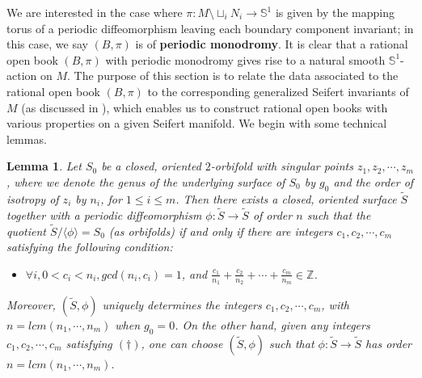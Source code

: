 \documentclass[11pt]{amsart}
\theoremstyle{plain}
\numberwithin{theorem}{section}
\newtheorem{lemma}[theorem]{Lemma}
\theoremstyle{definition}
\newcommand{\Z}{{\mathbb Z}}
\newcommand{\s}{{\mathbb S}}
\begin{document}
We are interested in the case where $\pi: M\setminus \sqcup_i N_i\rightarrow \s^1$ is given by the mapping torus of a periodic diffeomorphism leaving each boundary component invariant; in this case, we say $(B,\pi)$ is of {\bf periodic monodromy}. It is clear that a rational open book $(B,\pi)$ with periodic monodromy gives rise to a natural smooth $\s^1$-action on $M$. The purpose of this section is to relate the data associated to the rational open book $(B,\pi)$ to the corresponding generalized Seifert invariants of $M$ (as discussed in \cite{N}), which enables us to construct rational open books with various properties on a given Seifert manifold. We begin with some technical lemmas. 

\begin{lemma}
Let $S_0$ be a closed, oriented $2$-orbifold with singular points $z_1,z_2,\cdots,z_m$, where we denote the genus of the underlying surface of $S_0$ by $g_0$ and the order of isotropy of $z_i$ by
$n_i$, for $1\leq i\leq m$. Then there exists a closed, oriented surface $\tilde{S}$ together 
with a periodic diffeomorphism $\phi: \tilde{S}\rightarrow \tilde{S}$ of order $n$ such that the quotient 
$\tilde{S}/\langle \phi\rangle=S_0$ {\em(}as orbifolds{\em)} if and only if there are integers $c_1,c_2,\cdots,c_m$ satisfying the following condition:
\begin{itemize}
\item[{(\dag)}] $\forall i, 0<c_i<n_i, gcd(n_i,c_i)=1$, and 
$\frac{c_1}{n_1}+\frac{c_2}{n_2}+\cdots+\frac{c_m}{n_m}\in\Z$.
\end{itemize}
Moreover, $(\tilde{S},\phi)$ uniquely determines the integers $c_1,c_2,\cdots,c_m$, with
$n=lcm(n_1,\cdots,n_m)$ when $g_0=0$. On the other hand, given any integers 
$c_1,c_2,\cdots,c_m$ satisfying $(\dag)$, one can choose $(\tilde{S},\phi)$ such that 
$\phi: \tilde{S}\rightarrow \tilde{S}$ has order $n=lcm(n_1,\cdots,n_m)$.
\end{lemma}
\end{document}
